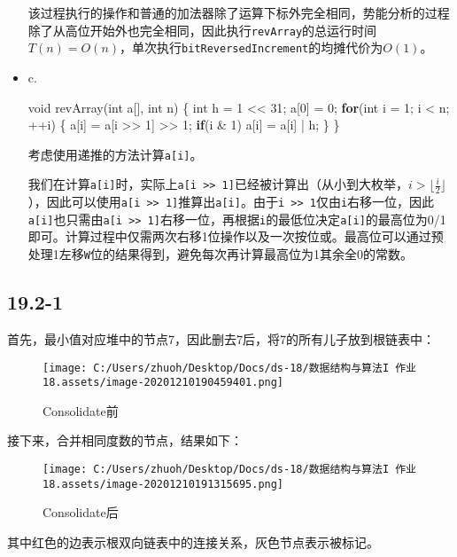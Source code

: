 \documentclass[]{article}
\newenvironment{Shaded}{}{}
\newcommand{\ControlFlowTok}[1]{\textcolor[rgb]{0.00,0.44,0.13}{\textbf{#1}}}
\newcommand{\DataTypeTok}[1]{\textcolor[rgb]{0.56,0.13,0.00}{#1}}
\newcommand{\DecValTok}[1]{\textcolor[rgb]{0.25,0.63,0.44}{#1}}
\newcommand{\NormalTok}[1]{#1}
\begin{document}
\begin{itemize}
  该过程执行的操作和普通的加法器除了运算下标外完全相同，势能分析的过程除了从高位开始外也完全相同，因此执行\texttt{revArray}的总运行时间\(T(n) = O(n)\)，单次执行\texttt{bitReversedIncrement}的均摊代价为\(O(1)\)。
\item
  c.

\begin{Shaded}
\begin{Highlighting}[]
\DataTypeTok{void}\NormalTok{ revArray(}\DataTypeTok{int}\NormalTok{ a[], }\DataTypeTok{int}\NormalTok{ n) \{}
    \DataTypeTok{int}\NormalTok{ h = }\DecValTok{1}\NormalTok{ << }\DecValTok{31}\NormalTok{;}
\NormalTok{    a[}\DecValTok{0}\NormalTok{] = }\DecValTok{0}\NormalTok{;}
    \ControlFlowTok{for}\NormalTok{(}\DataTypeTok{int}\NormalTok{ i = }\DecValTok{1}\NormalTok{; i < n; ++i) \{}
\NormalTok{        a[i] = a[i >> }\DecValTok{1}\NormalTok{] >> }\DecValTok{1}\NormalTok{;}
        \ControlFlowTok{if}\NormalTok{(i & }\DecValTok{1}\NormalTok{) a[i] = a[i] | h;}
\NormalTok{    \}}
\NormalTok{\}}
\end{Highlighting}
\end{Shaded}

  考虑使用递推的方法计算\texttt{a{[}i{]}}。

  我们在计算\texttt{a{[}i{]}}时，实际上\texttt{a{[}i\ \textgreater{}\textgreater{}\ 1{]}}已经被计算出（从小到大枚举，\(i > \lfloor \frac{i}{2} \rfloor\)），因此可以使用\texttt{a{[}i\ \textgreater{}\textgreater{}\ 1{]}}推算出\texttt{a{[}i{]}}。由于\texttt{i\ \textgreater{}\textgreater{}\ 1}仅由\texttt{i}右移一位，因此\texttt{a{[}i{]}}也只需由\texttt{a{[}i\ \textgreater{}\textgreater{}\ 1{]}}右移一位，再根据\texttt{i}的最低位决定\texttt{a{[}i{]}}的最高位为0/1即可。计算过程中仅需两次右移1位操作以及一次按位或。最高位可以通过预处理1左移\texttt{W}位的结果得到，避免每次再计算最高位为1其余全0的常数。
\end{itemize}

\hypertarget{header-n44}{%
\subsection{19.2-1}\label{header-n44}}

首先，最小值对应堆中的节点7，因此删去7后，将7的所有儿子放到根链表中：

\begin{figure}
\centering
\texttt{[image: C:/Users/zhuoh/Desktop/Docs/ds-18/数据结构与算法I 作业18.assets/image-20201210190459401.png]}
\caption{Consolidate前}
\end{figure}

接下来，合并相同度数的节点，结果如下：

\begin{figure}
\centering
\texttt{[image: C:/Users/zhuoh/Desktop/Docs/ds-18/数据结构与算法I 作业18.assets/image-20201210191315695.png]}
\caption{Consolidate后}
\end{figure}

其中红色的边表示根双向链表中的连接关系，灰色节点表示被标记。
\end{document}

